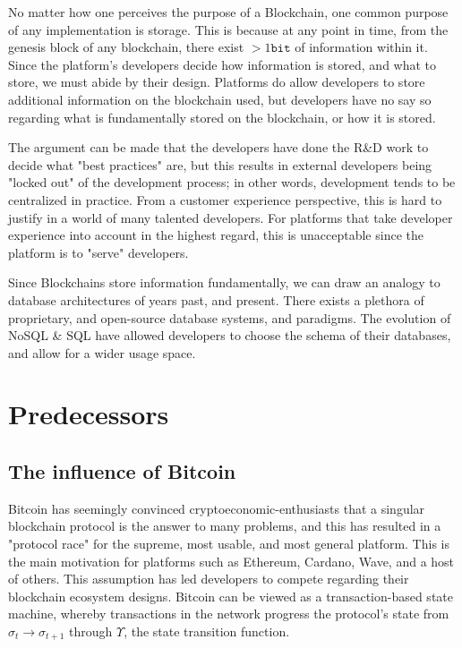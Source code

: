 \documentclass[12pt, titlepage, twocolumn]{report}
\begin{document}
No matter how one perceives the purpose of a Blockchain, one common purpose of any implementation is storage. This is because at any point in time, from the genesis block of any blockchain, there exist \(> 1 \texttt{bit}\) of information within it. Since the platform's developers decide how information is stored, and what to store, we must abide by their design. Platforms do allow developers to store additional information on the blockchain used, but developers have no say so regarding what is fundamentally stored on the blockchain, or how it is stored. 

The argument can be made that the developers have done the R\&D work to decide what "best practices" are, but this results in external developers being "locked out" of the development process; in other words, development tends to be centralized in practice. From a customer experience perspective, this is hard to justify in a world of many talented developers. For platforms that take developer experience into account in the highest regard, this is unacceptable since the platform is to "serve" developers.

Since Blockchains store information fundamentally, we can draw an analogy to database architectures of years past, and present. There exists a plethora of proprietary, and open-source database systems, and paradigms. The evolution of NoSQL \& SQL have allowed developers to choose the schema of their databases, and allow for a wider usage space.

\chapter{Predecessors}

\section{The influence of Bitcoin}
Bitcoin has seemingly convinced cryptoeconomic-enthusiasts that a singular blockchain protocol is the answer to many problems, and this has resulted in a "protocol race" for the supreme, most usable, and most general platform. This is the main motivation for platforms such as Ethereum, Cardano, Wave, and a host of others. This assumption has led developers to compete regarding their blockchain ecosystem designs. Bitcoin can be viewed as a transaction-based state machine, whereby transactions in the network progress the protocol's state from \(\sigma_t \rightarrow \sigma_{t+1}\) through \(\Upsilon\), the state transition function.
\end{document}

